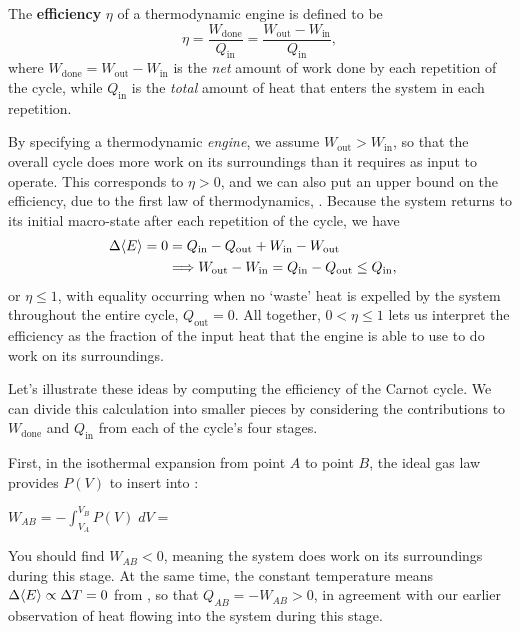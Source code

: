 \begin{shaded}
  The \textbf{efficiency} $\eta$ of a thermodynamic engine is defined to be
  \begin{equation}
    \label{eq:efficiency}
    \eta = \frac{W_{\text{done}}}{Q_{\text{in}}} = \frac{W_{\text{out}} - W_{\text{in}}}{Q_{\text{in}}},
  \end{equation}
  where $W_{\text{done}} = W_{\text{out}} - W_{\text{in}}$ is the \textit{net} amount of work done by each repetition of the cycle, while $Q_{\text{in}}$ is the \textit{total} amount of heat that enters the system in each repetition.
\end{shaded}

By specifying a thermodynamic \textit{engine}, we assume $W_{\text{out}} > W_{\text{in}}$, so that the overall cycle does more work on its surroundings than it requires as input to operate.
This corresponds to $\eta > 0$, and we can also put an upper bound on the efficiency, due to the first law of thermodynamics, .
Because the system returns to its initial macro-state after each repetition of the cycle, we have
\begin{align}
  \Delta\!\left\langle E \right\rangle = 0 & = Q_{\text{in}} - Q_{\text{out}} + W_{\text{in}} - W_{\text{out}} \cr
                   & \Longrightarrow W_{\text{out}} - W_{\text{in}} = Q_{\text{in}} - Q_{\text{out}} \leq Q_{\text{in}}, \label{eq:cycle_heat_work}
\end{align}
or $\eta \leq 1$, with equality occurring when no `waste' heat is expelled by the system throughout the entire cycle, $Q_{\text{out}} = 0$.
All together, $0 < \eta \leq 1$ lets us interpret the efficiency as the fraction of the input heat that the engine is able to use to do work on its surroundings.

Let's illustrate these ideas by computing the efficiency of the Carnot cycle.
We can divide this calculation into smaller pieces by considering the contributions to $W_{\text{done}}$ and $Q_{\text{in}}$ from each of the cycle's four stages.

\newpage %
First, in the isothermal expansion from point $A$ to point $B$, the ideal gas law provides $P(V)$ to insert into :
\begin{mdframed}
  $\displaystyle W_{AB} = -\int_{V_A}^{V_B} P(V) \; dV = $ \\[50 pt]
\end{mdframed}
You should find $W_{AB} < 0$, meaning the system does work on its surroundings during this stage.
At the same time, the constant temperature means $\Delta\!\left\langle E \right\rangle \propto \Delta T = 0$ from , so that $Q_{AB} = -W_{AB} > 0$, in agreement with our earlier observation of heat flowing into the system during this stage.

